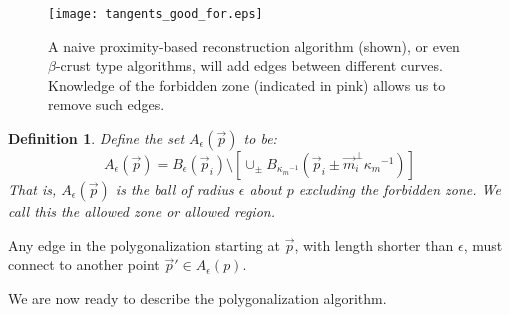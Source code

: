 \documentclass{article}
\newtheorem{definition}[cntr]{Definition}
\numberwithin{cntr}{section}
\numberwithin{equation}{section}
\newcommand{\vp}[0]{{\vec{p}}}
\newcommand{\vm}[0]{{\vec{m}}}
\newcommand{\ball}[2]{ { B_{#1}(#2) } }
\newcommand{\allowed}[2]{ { A_{#1}(#2) } }
\newcommand{\kmax}{{\kappa_{m}}}
\newcommand{\kmaxi}{{\kmax^{-1}}}
\begin{document}
\begin{figure}
\setlength{\unitlength}{0.240900pt}
\ifx\plotpoint\undefined\newsavebox{\plotpoint}\fi
\sbox{\plotpoint}{\rule[-0.200pt]{0.400pt}{0.400pt}}%
\texttt{[image: tangents\_good\_for.eps]}

\caption{A naive proximity-based reconstruction algorithm (shown), or even $\beta$-crust type algorithms, will add edges between different curves. Knowledge of the forbidden zone (indicated in pink) allows us to remove such edges.}
\label{fig:proximityVsTangentBased}
\end{figure}

\begin{definition}
  Define the set $\allowed{\epsilon}{\vp}$ to be:
  \begin{equation}
    \label{eq:allowedRegion}
    \allowed{\epsilon}{\vp}=\ball{\epsilon}{\vp_{i}} \setminus \left[ \cup_{\pm} \ball{\kmaxi}{\vp_{i} \pm \vm_{i}^{\perp} \kmaxi} \right]
  \end{equation}
  That is, $\allowed{\epsilon}{\vp}$ is the ball of radius $\epsilon$ about $p$ excluding the forbidden zone.  We call this the \emph{allowed zone} or \emph{allowed region}.
\end{definition}
Any edge in the polygonalization starting at $\vp$, with length shorter than $\epsilon$, must connect to another point $\vp' \in \allowed{\epsilon}{p}$.

We are now ready to describe the polygonalization algorithm.
\end{document}
